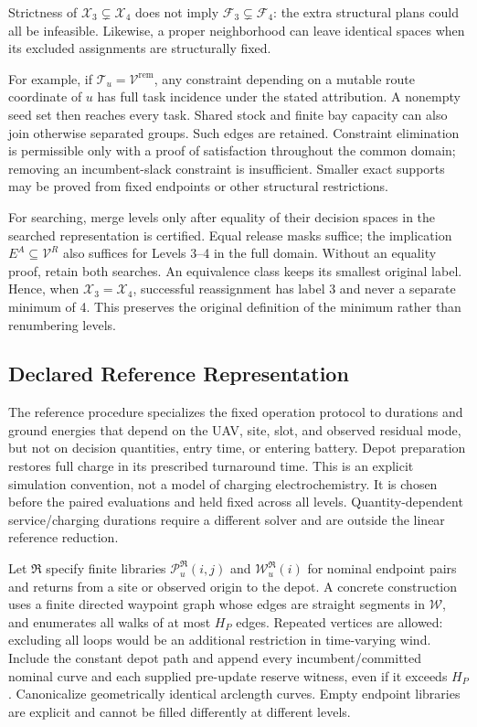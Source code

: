Strictness of $\mathcal X_3\subsetneq\mathcal X_4$ does not imply
$\mathcal F_3\subsetneq\mathcal F_4$: the extra structural plans could
all be infeasible. Likewise, a proper neighborhood can leave identical
spaces when its excluded assignments are structurally fixed.

For example, if $\mathcal T_u=\mathcal V^{\mathrm{rem}}$, any constraint
depending on a mutable route coordinate of $u$ has full task incidence
under the stated attribution. A nonempty seed set then reaches every task.
Shared stock and finite bay capacity can also join otherwise separated
groups. Such edges are retained. Constraint elimination is permissible
only with a proof of satisfaction throughout the common domain; removing
an incumbent-slack constraint is insufficient. Smaller exact supports may
be proved from fixed endpoints or other structural restrictions.

For searching, merge levels only after equality of their decision spaces
in the searched representation is certified. Equal release masks suffice;
the implication $E^A\subseteq\mathcal V^R$ also suffices for Levels 3--4
in the full domain. Without an equality proof, retain both searches.
An equivalence class keeps its smallest original label. Hence, when
$\mathcal X_3=\mathcal X_4$, successful reassignment has label 3 and never
a separate minimum of 4. This preserves the original definition of the
minimum rather than renumbering levels.

\subsection{Declared Reference Representation}
\label{subsec:reference_domain}

The reference procedure specializes the fixed operation protocol to
durations and ground energies that depend on the UAV, site, slot, and
observed residual mode, but not on decision quantities, entry time, or
entering battery. Depot preparation restores full charge in its prescribed
turnaround time. This is an explicit simulation convention, not a model
of charging electrochemistry. It is chosen before the paired evaluations
and held fixed across all levels. Quantity-dependent service/charging
durations require a different solver and are outside the linear reference
reduction.

Let $\mathfrak R$ specify finite libraries
$\mathscr P_u^{\mathfrak R}(i,j)$ and
$\mathscr W_u^{\mathfrak R}(i)$ for nominal endpoint pairs and returns
from a site or observed origin to the depot. A concrete construction uses
a finite directed waypoint graph whose edges are straight segments in
$\mathcal W$, and enumerates all walks of at most $H_P$ edges.
Repeated vertices are allowed: excluding all loops would be an additional
restriction in time-varying wind. Include the constant depot path and
append every incumbent/committed nominal curve and each supplied
pre-update reserve witness, even if it exceeds $H_P$.
Canonicalize geometrically identical arclength curves.
Empty endpoint libraries are explicit and cannot be filled differently
at different levels.

